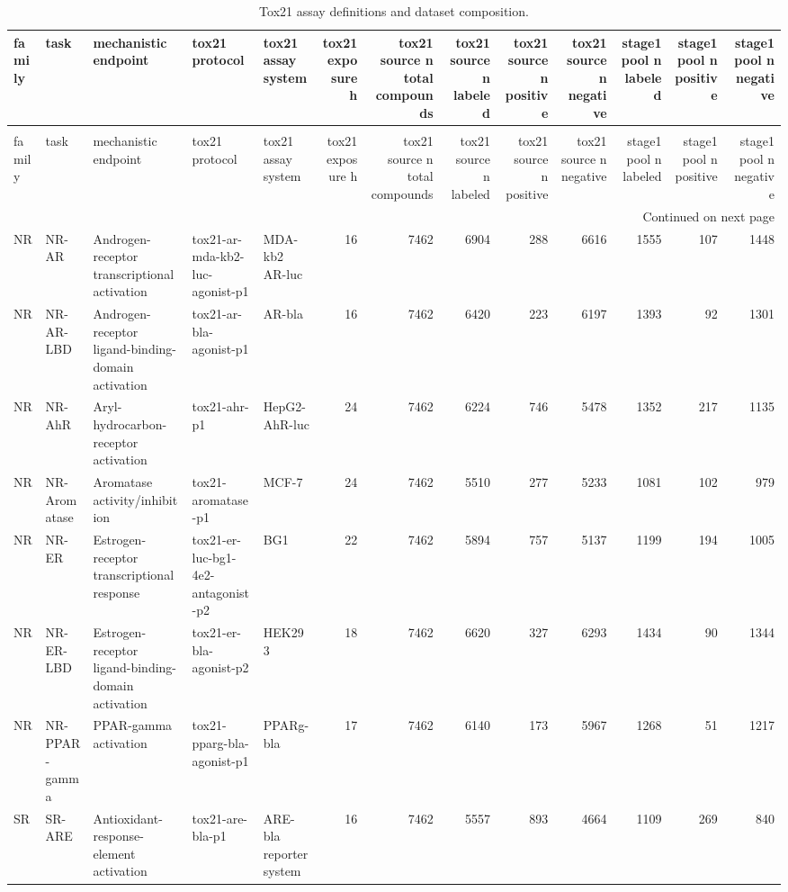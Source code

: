 \begin{longtable}{lllllrrrrrrrr}
\caption{Tox21 assay definitions and dataset composition.} \label{tab:tox21_dataset_statistics} \\
\toprule
family & task & mechanistic endpoint & tox21 protocol & tox21 assay system & tox21 exposure h & tox21 source n total compounds & tox21 source n labeled & tox21 source n positive & tox21 source n negative & stage1 pool n labeled & stage1 pool n positive & stage1 pool n negative \\
\midrule
\endfirsthead
\caption[]{Tox21 assay definitions and dataset composition.} \\
\toprule
family & task & mechanistic endpoint & tox21 protocol & tox21 assay system & tox21 exposure h & tox21 source n total compounds & tox21 source n labeled & tox21 source n positive & tox21 source n negative & stage1 pool n labeled & stage1 pool n positive & stage1 pool n negative \\
\midrule
\endhead
\midrule
\multicolumn{13}{r}{Continued on next page} \\
\midrule
\endfoot
\bottomrule
\endlastfoot
NR & NR-AR & Androgen-receptor transcriptional activation & tox21-ar-mda-kb2-luc-agonist-p1 & MDA-kb2 AR-luc & 16 & 7462 & 6904 & 288 & 6616 & 1555 & 107 & 1448 \\
NR & NR-AR-LBD & Androgen-receptor ligand-binding-domain activation & tox21-ar-bla-agonist-p1 & AR-bla & 16 & 7462 & 6420 & 223 & 6197 & 1393 & 92 & 1301 \\
NR & NR-AhR & Aryl-hydrocarbon-receptor activation & tox21-ahr-p1 & HepG2-AhR-luc & 24 & 7462 & 6224 & 746 & 5478 & 1352 & 217 & 1135 \\
NR & NR-Aromatase & Aromatase activity/inhibition & tox21-aromatase-p1 & MCF-7 & 24 & 7462 & 5510 & 277 & 5233 & 1081 & 102 & 979 \\
NR & NR-ER & Estrogen-receptor transcriptional response & tox21-er-luc-bg1-4e2-antagonist-p2 & BG1 & 22 & 7462 & 5894 & 757 & 5137 & 1199 & 194 & 1005 \\
NR & NR-ER-LBD & Estrogen-receptor ligand-binding-domain activation & tox21-er-bla-agonist-p2 & HEK293 & 18 & 7462 & 6620 & 327 & 6293 & 1434 & 90 & 1344 \\
NR & NR-PPAR-gamma & PPAR-gamma activation & tox21-pparg-bla-agonist-p1 & PPARg-bla & 17 & 7462 & 6140 & 173 & 5967 & 1268 & 51 & 1217 \\
SR & SR-ARE & Antioxidant-response-element activation & tox21-are-bla-p1 & ARE-bla reporter system & 16 & 7462 & 5557 & 893 & 4664 & 1109 & 269 & 840 \\

\end{longtable}
